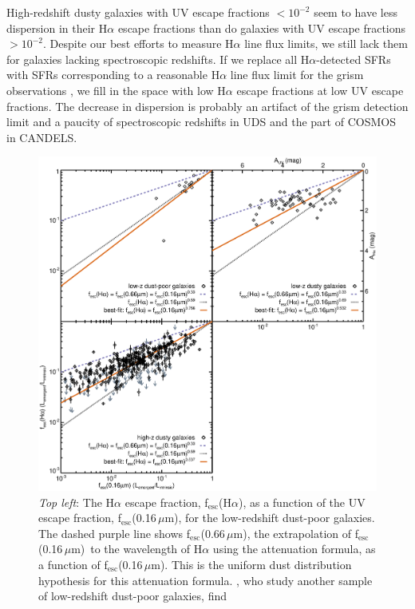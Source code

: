\documentclass[referee]{aa}
\newcommand{\alephuv}{f$_{\mathrm{esc}}$(0.16$\,\mu$m)}
\newcommand{\alephha}{f$_{\mathrm{esc}}$(H$\alpha$)}
\newcommand{\alephuvha}{f$_{\mathrm{esc}}$(0.66$\,\mu$m)}
\begin{document}
High-redshift dusty galaxies with UV escape fractions $< 10^{-2}$ seem to have
less dispersion in their H$\alpha$ escape fractions than do galaxies with UV
escape fractions $> 10^{-2}$.  Despite our best efforts to measure H$\alpha$
line flux limits, we still lack them for galaxies lacking spectroscopic
redshifts.  If we replace all H$\alpha$-detected SFRs with SFRs corresponding
to a reasonable H$\alpha$ line flux limit for the grism observations
\citep[$5 \times 10^{-17}$ erg s$^{-1}$ cm$^{-2}$,][]{brammer12}, we fill in the space with low
H$\alpha$ escape fractions at low UV escape fractions.  The decrease in
dispersion is probably an artifact of the grism detection limit and a paucity
of spectroscopic redshifts in UDS and the part of COSMOS in CANDELS.

\begin{figure}[!ht]
\centering
\includegraphics[scale=0.365]{fha_fuv.eps}
\caption{{\small \emph{Top left}: The H$\alpha$ escape fraction, \alephha, as a
function of the UV
escape fraction, \alephuv, for the low-redshift
dust-poor galaxies.  The dashed purple line shows \alephuvha, the extrapolation
of \alephuv~to the wavelength of H$\alpha$ using the \citet{calzetti00}
attenuation formula, as a function of \alephuv.  This is the uniform dust
distribution hypothesis for this attenuation formula.  \citet{calzetti97b}, who
study another sample of low-redshift dust-poor galaxies, find
}}
\end{figure}
\end{document}
